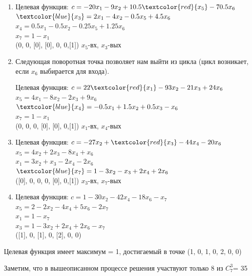 \documentclass{article}
\begin{document}
\begin{enumerate}
    \item Целевая функция: $c = -20x_1 - 9x_2 + 10.5\textcolor{red}{x_5} - 70.5x_6$\\
    $\textcolor{blue}{x_3} = 2x_1 - 4x_2  - 0.5x_5 + 4.5x_6$\\
    $x_4 = 0.5x_1 - 0.5x_2 - 0.25x_5 + 1.25x_6$\\
    $x_7 = 1 - x_1$\\
    (0, 0, [0], [0], 0, 0,[1]) $x_5$-вх, $x_3$-вых

    \item Следующая поворотная точка позволяет нам выйти из цикла (цикл возникает, если $x_6$ выбирается для входа).

    Целевая функция: $c = 22\textcolor{red}{x_1} - 93x_2 - 21x_3 + 24x_6$\\
    $x_5 = 4x_1 - 8x_2 - 2x_3 + 9x_6$\\
    $\textcolor{blue}{x_4} = -0.5x_1 + 1.5x_2 + 0.5x_3 - x_6$\\
    $x_7 = 1 - x_1$\\
    (0, 0, 0, [0], [0], 0,[1]) $x_1$-вх, $x_4$-вых

    \item Целевая функция: $c = -27x_2 + \textcolor{red}{x_3} - 44x_4 - 20x_6$\\
    $x_5 = 4x_2 + 2x_3 - 8x_4 + x_6$\\
    $x_1 = 3x_2 + x_3 - 2x_4 - 2x_6$\\
    $\textcolor{blue}{x_7} = 1 - 3x_2 - x_3 + 2x_4 + 2x_6$\\
    ([0], 0, 0, 0, [0], 0,[1]) $x_3$-вх, $x_7$-вых

    \item Целевая функция: $c = 1 - 30x_2-42x_4-18x_6-x_7$\\
    $x_5 = 2 - 2x_2 - 4x_4 +5x_6 - 2x_7$\\
    $x_1 = 1 - x_7$\\
    $x_3 = 1 - 3x_2 + 2x_4 + 2x_6 - x_7$\\
    ([1], 0, [1], 0, [2], 0, 0)
    \end{enumerate}
    Целевая функция имеет максимум = 1, достигаемый в точке (1, 0, 1, 0, 2, 0, 0)

    Заметим, что в вышеописанном процессе решения участвуют только 8 из $C^3_7$= 35
\end{document}
